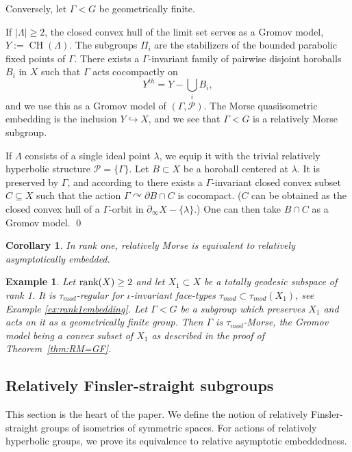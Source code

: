 \documentclass[12pt]{article}
\theoremstyle{boldplain}
\newtheorem{cor}[equation]{Corollary}
\theoremstyle{bolddefinition}
\newtheorem{example}[equation]{Example}
\numberwithin{equation}{section}
\def\P{\mathcal P}
\def\Ga{\Gamma}
\def\la{\lambda}
\def\La{\Lambda}
\def\acts{\curvearrowright}
\def\CH{\operatorname{CH}}
\def\D{\partial}
\def\embed{\hookrightarrow}
\def\geo{\partial_{\infty}}
\def\rank{\mathop{\hbox{rank}}}
\def\taumod{\tau_{mod}}
\begin{document}
Conversely, let $\Ga<G$ be geometrically finite. 

If $|\La|\geq2$,
the closed convex hull of the limit set serves as a Gromov model, $Y:= \CH(\La)$.
The subgroups $\Pi_i$ are the stabilizers of the bounded parabolic fixed points of $\Ga$. 
There exists a $\Ga$-invariant family of pairwise disjoint horoballs $B_i$ 
in $X$ such that $\Ga$ acts cocompactly on 
$$
Y^{th}= Y- \bigcup_{i} B_i, 
$$
and we use this as a Gromov model of $(\Ga,\P)$. 
The Morse quasiisometric embedding is the inclusion $Y\embed X$,
and we see that $\Ga< G$ is a relatively Morse subgroup. 

If $\La$ consists of a single ideal point $\la$,
we equip it with the trivial relatively hyperbolic structure $\P=\{\Ga\}$. 
Let $B\subset X$ be a horoball centered at $\la$. 
It is preserved by $\Ga$, 
and according to \cite[sect. 4]{Bowditch}
there exists a $\Ga$-invariant closed convex subset $C\subseteq X$
such that the action $\Ga\acts \D B\cap C$ is cocompact.
($C$ can be obtained as the closed convex hull of a $\Ga$-orbit in $\geo X-\{\la\}$.)
One can then take $B\cap C$ as a Gromov model.
\qed 

\begin{cor}
\label{cor:rlmqvsmbemb}
In rank one,
relatively Morse is equivalent to relatively asymptotically embedded.
\end{cor}

\begin{example}\label{ex:geodembedding}
Let $\rank(X)\geq2$ 
and let $X_1\subset X$ be a totally geodesic subspace of rank 1. 
It is $\taumod$-regular for $\iota$-invariant face-types $\taumod\subset \taumod(X_1)$, 
see Example \ref{ex:rank1embedding}. Let $\Ga<G$ be a subgroup which preserves $X_1$ 
and acts on it as a geometrically finite group.
Then $\Ga$ is $\taumod$-Morse,
the Gromov model being a convex subset of $X_1$ as described in the proof of Theorem~\ref{thm:RM=GF}.
\end{example}



\subsection{Relatively Finsler-straight subgroups}
\label{sec:str=ae}

This section is the heart of the paper. 
We define the notion of relatively Finsler-straight groups of isometries of symmetric spaces.
For actions of relatively hyperbolic groups, we prove its equivalence to relative asymptotic embeddedness.
\end{document}

